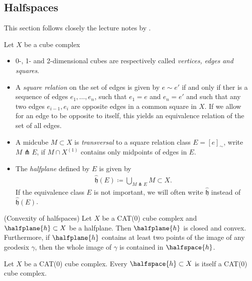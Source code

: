 \subsection{Halfspaces}
\label{sec:halfspaces}

This section follows closely the lecture notes by \textcite{Rolli2012}.

\begin{defin}
  Let \(X\) be a cube complex
  \begin{itemize}
  \item 0-, 1- and 2-dimensional cubes are respectively called \emph{vertices, edges and squares}.
  \item A \emph{square relation} on the set of edges is given by \(e \sim e'\) if and only if ther is a sequence of edges \(e_1, \dots, e_n\), such that \(e_1 = e\) and \(e_n = e'\) and such that any two edges \(e_{i-1}, e_i\) are opposite edges in a common square in \(X\). If we allow for an edge to be opposite to itself, this yields an equivalence relation of the set of all edges.
  \item A midcube \(M \subset X\) is \emph{transversal} to a square relation class \(E = [e]_\sim\), write \(M \pitchfork E\), if \(M \cap X^{(1)}\) contains only midpoints of edges in \(E\).
  \item The \emph{halfplane} defined by \(E\) is given by
    \begin{align*}
      \mathfrak{\hat h}(E) \coloneqq \bigcup_{M \pitchfork E} M \subset X.
    \end{align*}
    If the equivalence class \(E\) is not important, we will often write \(\mathfrak{\hat h}\) instead of \(\mathfrak{\hat h}(E)\).
  \end{itemize}
\end{defin}

\begin{prop}(Convexity of halfspaces)
  Let \(X\) be a CAT(0) cube complex and \(\halfplane{h} \subset X\) be a halfplane. Then \(\halfplane{h}\) is closed and convex. Furthermore, if \(\halfplane{h}\) contains at least two points of the image of any geodesix \(\gamma\), then the whole image of \(\gamma\) is contained in \(\halfspace{h}\).
\end{prop}

\begin{cor}
  Let \(X\) be a CAT(0) cube complex. Every \(\halfspace{h} \subset X\) is itself a CAT(0) cube complex.
\end{cor}


